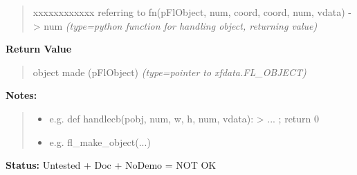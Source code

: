 \begin{boxedminipage}{\funcwidth}
\begin{quote}
\begin{Ventry}{xxxxxxxxxxxx}
referring to fn(pFlObject, num, coord, coord, num, vdata) -> num
            {\it (type=python function for handling object, returning value)}

        \end{Ventry}

      \end{quote}

      \textbf{Return Value}
    \vspace{-1ex}

      \begin{quote}

object made (pFlObject)
      {\it (type=pointer to xfdata.FL\_OBJECT)}

      \end{quote}

\textbf{Notes:}
\begin{quote}
  \begin{itemize}

  \item
    \setlength{\parskip}{0.6ex}

e.g. def handlecb(pobj, num, w, h, num, vdata): > ... ; return 0


  \item 
e.g. fl\_make\_object(...)


\end{itemize}

\end{quote}

\textbf{Status:} 
Untested + Doc + NoDemo = NOT OK


    \end{boxedminipage}

    \label{xformslib:flbasic:fl_add_child}

    \vspace{0.5ex}

